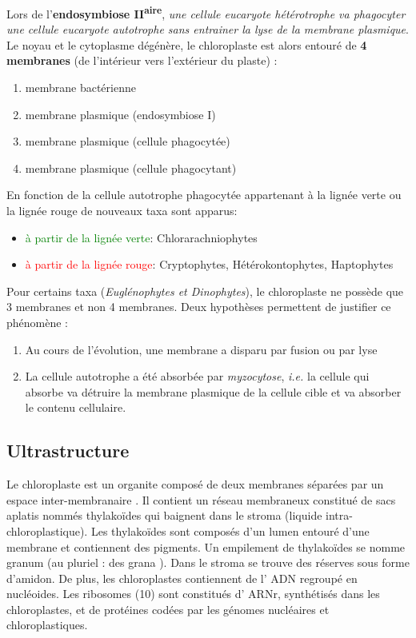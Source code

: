 \documentclass[
]{book}
\providecommand{\tightlist}{%
  \setlength{\itemsep}{0pt}\setlength{\parskip}{0pt}}
\begin{document}
Lors de l'\textbf{endosymbiose II\textsuperscript{aire}}, \emph{une cellule eucaryote hétérotrophe va phagocyter une cellule eucaryote autotrophe sans entrainer la lyse de la membrane plasmique}. Le noyau et le cytoplasme dégénère, le chloroplaste est alors entouré de \textbf{4 membranes} (de l'intérieur vers l'extérieur du plaste) :

\begin{enumerate}
\def\labelenumi{\arabic{enumi}.}
\tightlist
\item
  membrane bactérienne
\item
  membrane plasmique (endosymbiose I)
\item
  membrane plasmique (cellule phagocytée)
\item
  membrane plasmique (cellule phagocytant)
\end{enumerate}

En fonction de la cellule autotrophe phagocytée appartenant à la lignée verte ou la lignée rouge de nouveaux taxa sont apparus:

\begin{itemize}
\tightlist
\item
  \textcolor{green}{à partir de la lignée verte}: Chlorarachniophytes
\item
  \textcolor{red}{à partir de la lignée rouge}: Cryptophytes, Hétérokontophytes, Haptophytes
\end{itemize}

Pour certains taxa (\emph{Euglénophytes et Dinophytes}), le chloroplaste ne possède que 3 membranes et non 4 membranes. Deux hypothèses permettent de justifier ce phénomène :

\begin{enumerate}
\def\labelenumi{\arabic{enumi}.}
\tightlist
\item
  Au cours de l'évolution, une membrane a disparu par fusion ou par lyse
\item
  La cellule autotrophe a été absorbée par \emph{myzocytose}, \emph{i.e.} la cellule qui absorbe va détruire la membrane plasmique de la cellule cible et va absorber le contenu cellulaire.
\end{enumerate}

\hypertarget{ultrastructure}{%
\subsection{Ultrastructure}\label{ultrastructure}}

Le chloroplaste est un organite composé de deux membranes séparées par un espace inter-membranaire . Il contient un réseau membraneux constitué de sacs aplatis nommés thylakoïdes qui baignent dans le stroma (liquide intra-chloroplastique). Les thylakoïdes sont composés d'un lumen entouré d'une membrane et contiennent des pigments. Un empilement de thylakoïdes se nomme granum (au pluriel : des grana ). Dans le stroma se trouve des réserves sous forme d'amidon.
De plus, les chloroplastes contiennent de l' ADN regroupé en nucléoides. Les ribosomes (10) sont constitués d' ARNr, synthétisés dans les chloroplastes, et de protéines codées par les génomes nucléaires et chloroplastiques.
\end{document}
